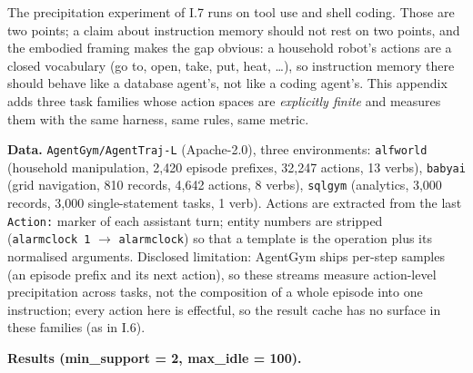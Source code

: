 \documentclass[
  11pt,
]{article}
\begin{document}
The precipitation experiment of I.7 runs on tool use and shell coding.
Those are two points; a claim about instruction memory should not rest
on two points, and the embodied framing makes the gap obvious: a
household robot's actions are a closed vocabulary (go to, open, take,
put, heat, \ldots), so instruction memory there should behave like a
database agent's, not like a coding agent's. This appendix adds three
task families whose action spaces are \emph{explicitly finite} and
measures them with the same harness, same rules, same metric.

\textbf{Data.} \texttt{AgentGym/AgentTraj-L} (Apache-2.0), three
environments: \texttt{alfworld} (household manipulation, 2,420 episode
prefixes, 32,247 actions, 13 verbs), \texttt{babyai} (grid navigation,
810 records, 4,642 actions, 8 verbs), \texttt{sqlgym} (analytics, 3,000
records, 3,000 single-statement tasks, 1 verb). Actions are extracted
from the last \texttt{Action:} marker of each assistant turn; entity
numbers are stripped (\texttt{alarmclock\ 1} \(\rightarrow\)
\texttt{alarmclock}) so that a template is the operation plus its
normalised arguments. Disclosed limitation: AgentGym ships per-step
samples (an episode prefix and its next action), so these streams
measure action-level precipitation across tasks, not the composition of
a whole episode into one instruction; every action here is effectful, so
the result cache has no surface in these families (as in I.6).

\textbf{Results (min\_support = 2, max\_idle = 100).}
\end{document}
